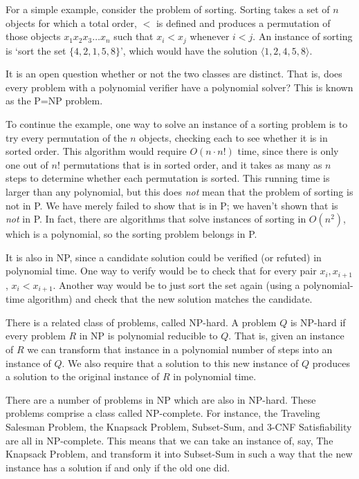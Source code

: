 \documentclass[12pt,x11names, rgb]{article}
\begin{document}
    For a simple example, consider the problem of sorting.  Sorting takes a set of $n$ objects for which a total order, $<$ is defined and produces a permutation of those objects $x_1 x_2 x_3 \ldots x_n$ such that $x_i < x_j$ whenever $i < j$. An instance of sorting is `sort the set $\{4, 2 ,1, 5, 8\}$', which would have the solution $\langle 1, 2, 4, 5, 8 \rangle$. 

    It is an open question whether or not the two classes are distinct. That is, does every problem with a polynomial verifier have a polynomial solver? This is known as the P=NP problem.

    To continue the example, one way to solve an instance of a sorting problem is to try every permutation of the $n$ objects, checking each to see whether it is in sorted order. This algorithm would require $O(n\cdot n!)$ time, since there is only one out of $n!$ permutations that is in sorted order, and it takes as many as $n$ steps to determine whether each permutation is sorted. This running time is larger than any polynomial, but this does \emph{not} mean that the problem of sorting is not in P. We have merely failed to show that is in P; we haven't shown that is \emph{not} in P. In fact, there are algorithms that solve instances of sorting in $O(n^2)$, which is a polynomial, so the sorting problem belongs in P. 

    It is also in NP, since a candidate solution could be verified (or refuted) in polynomial time. One way to verify would be to check that for every pair $x_i, x_{i+1}$, $x_i < x_{i+1}$. Another way would be to just sort the set again (using a polynomial-time algorithm) and check that the new solution matches the candidate. 

    There is a related class of problems, called NP-hard. A problem $Q$ is NP-hard if every problem $R$ in NP is polynomial reducible to $Q$. That is, given an instance of $R$ we can transform that instance in a polynomial number of steps into an instance of $Q$. We also require that a solution to this new instance of $Q$ produces a solution to the original instance of $R$ in polynomial time.

    There are a number of problems in NP which are also in NP-hard. These problems comprise a class called NP-complete. For instance, the Traveling Salesman Problem, the Knapsack Problem, Subset-Sum, and 3-CNF Satisfiability are all in NP-complete. This means that we can take an instance of, say, The Knapsack Problem, and transform it into Subset-Sum in such a way that the new instance has a solution if and only if the old one did. %
\end{document}
